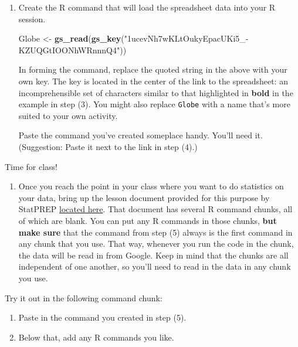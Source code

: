 \documentclass[]{book}
\newenvironment{Shaded}{\begin{snugshade}}{\end{snugshade}}
\newcommand{\KeywordTok}[1]{\textcolor[rgb]{0.13,0.29,0.53}{\textbf{#1}}}
\newcommand{\StringTok}[1]{\textcolor[rgb]{0.31,0.60,0.02}{#1}}
\newcommand{\NormalTok}[1]{#1}
\providecommand{\tightlist}{%
  \setlength{\itemsep}{0pt}\setlength{\parskip}{0pt}}
\theoremstyle{definition}
\theoremstyle{definition}
\theoremstyle{definition}
\theoremstyle{remark}
\begin{document}
\begin{enumerate}
\def\labelenumi{\arabic{enumi}.}
\setcounter{enumi}{5}
\item
  Create the R command that will load the spreadsheet data into your R
  session.

\begin{Shaded}
\begin{Highlighting}[]
\NormalTok{Globe <-}\StringTok{ }\KeywordTok{gs_read}\NormalTok{(}\KeywordTok{gs_key}\NormalTok{(}\StringTok{"1ucevNh7wKLtOukyEpacUKi5_-KZUQGtIOONhWRnnnQ4"}\NormalTok{))}
\end{Highlighting}
\end{Shaded}

  In forming the command, replace the quoted string in the above with
  your own key. The key is located in the center of the link to the
  spreadsheet: an incomprehensible set of characters similar to that
  highlighted in \textbf{bold} in the example in step (3). You might
  also replace \texttt{Globe} with a name that's more suited to your own
  activity.

  Paste the command you've created someplace handy. You'll need it.
  (Suggestion: Paste it next to the link in step (4).)
\end{enumerate}

Time for class!

\begin{enumerate}
\def\labelenumi{\arabic{enumi}.}
\setcounter{enumi}{6}
\tightlist
\item
  Once you reach the point in your class where you want to do statistics
  on your data, bring up the lesson document provided for this purpose
  by StatPREP
  \href{http://dtkaplan.shinyapps.io/Lesson_read_class_data.png}{located
  here}. That document has several R command chunks, all of which are
  blank. You can put any R commands in those chunks, \textbf{but make
  sure} that the command from step (5) always is the first command in
  any chunk that you use. That way, whenever you run the code in the
  chunk, the data will be read in from Google. Keep in mind that the
  chunks are all independent of one another, so you'll need to read in
  the data in any chunk you use.
\end{enumerate}

Try it out in the following command chunk:

\begin{enumerate}
\def\labelenumi{\alph{enumi}.}
\tightlist
\item
  Paste in the command you created in step (5).
\item
  Below that, add any R commands you like.
\end{enumerate}
\end{document}
